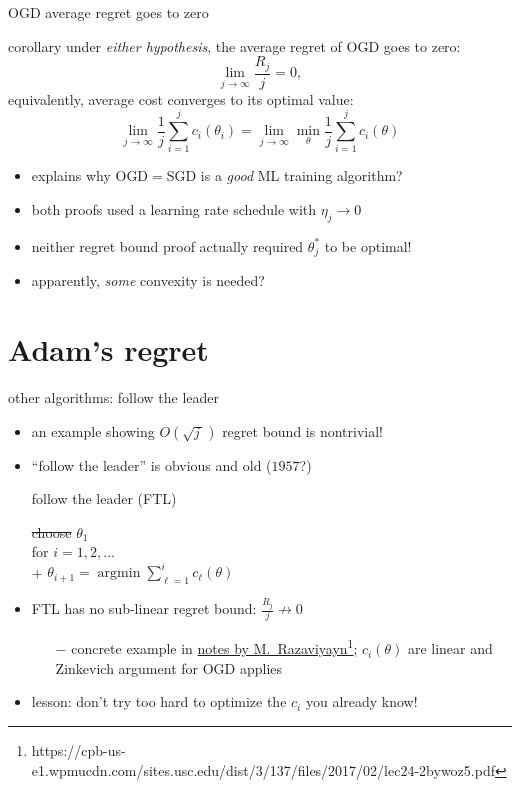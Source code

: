 \documentclass[svgnames,
               hyperref={colorlinks,citecolor=DeepPink4,linkcolor=FireBrick,urlcolor=Maroon},
               usepdftitle=false]  %
               {beamer}
\newcommand{\argmin}{\operatorname{argmin}}
\newcommand{\ds}{\displaystyle}
\begin{document}
\begin{frame}{OGD average regret goes to zero}

\begin{block}{corollary}
under \emph{either hypothesis}, the average regret of OGD goes to zero:
    $$\lim_{j\to\infty} \frac{R_j}{j} = 0,$$
equivalently, average cost converges to its optimal value:
    $$\lim_{j\to\infty} \frac{1}{j} \sum_{i=1}^j c_i(\theta_i) = \lim_{j\to\infty} \min_\theta \frac{1}{j} \sum_{i=1}^j c_i(\theta)$$
\end{block}

\begin{itemize}
\item explains why OGD$=$SGD is a \emph{good} ML training algorithm?
\item both proofs used a learning rate schedule with $\eta_j \to 0$
\item neither regret bound proof actually required $\theta_j^*$ to be optimal!
\item apparently, \emph{some} convexity is needed?
\end{itemize}
\end{frame}


\section{Adam's regret}

\begin{frame}{other algorithms: follow the leader}

\begin{itemize}
\item an example showing $O(\sqrt{j\,})$ regret bound is nontrivial!
\item ``follow the leader'' is obvious and old ($1957$?)

\begin{block}{follow the leader (FTL)}

\begin{pseudo*}
\st{choose} $\theta_1$ \\
for $i = 1,2,\dots$ \\+
    $\ds \theta_{i+1} = \argmin \sum_{\ell=1}^i c_\ell(\theta)$
\end{pseudo*}
\end{block}

\item FTL has no sub-linear regret bound: $\ds \frac{R_j}{j} \nrightarrow 0$
    \begin{itemize}
    \item[$-$] concrete example in \href{https://cpb-us-e1.wpmucdn.com/sites.usc.edu/dist/3/137/files/2017/02/lec24-2bywoz5.pdf}{notes by M.~Razaviyayn}\footnote{https://cpb-us-e1.wpmucdn.com/sites.usc.edu/dist/3/137/files/2017/02/lec24-2bywoz5.pdf}; $c_i(\theta)$ are linear and Zinkevich argument for OGD applies
    \end{itemize}
\item lesson: don't try too hard to optimize the $c_i$ you already know!
\end{itemize}
\end{frame}
\end{document}
